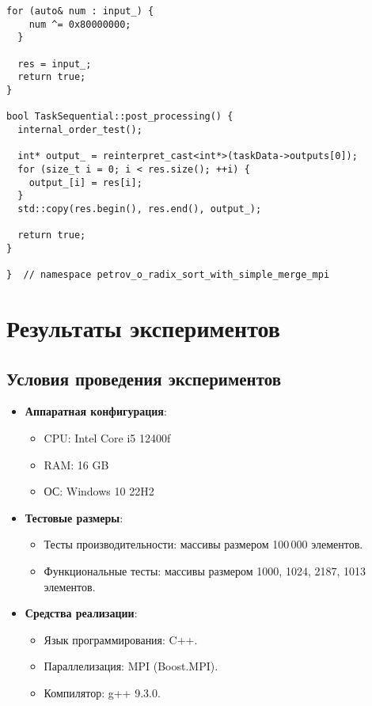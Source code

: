 \documentclass[12pt]{article}
\begin{document}
\begin{lstlisting}[caption={Параллельная версия поразрядной сортировки с использованием MPI}]
  for (auto& num : input_) {
    num ^= 0x80000000;
  }

  res = input_;
  return true;
}

bool TaskSequential::post_processing() {
  internal_order_test();

  int* output_ = reinterpret_cast<int*>(taskData->outputs[0]);
  for (size_t i = 0; i < res.size(); ++i) {
    output_[i] = res[i];
  }
  std::copy(res.begin(), res.end(), output_);

  return true;
}

}  // namespace petrov_o_radix_sort_with_simple_merge_mpi
\end{lstlisting}


\section{Результаты экспериментов}

\subsection{Условия проведения экспериментов}

\begin{itemize}
  \item \textbf{Аппаратная конфигурация}:
  \begin{itemize}
    \item CPU: Intel Core i5 12400f
    \item RAM: 16 GB
    \item ОС: Windows 10 22H2
  \end{itemize}
  \item \textbf{Тестовые размеры}:
  \begin{itemize}
    \item Тесты производительности: массивы размером 100\,000 элементов.
    \item Функциональные тесты: массивы размером 1000, 1024, 2187, 1013 элементов.
  \end{itemize}
  \item \textbf{Средства реализации}:
  \begin{itemize}
    \item Язык программирования: C++.
    \item Параллелизация: MPI (Boost.MPI).
    \item Компилятор: g++ 9.3.0.
  \end{itemize}
\end{itemize}
\end{document}
